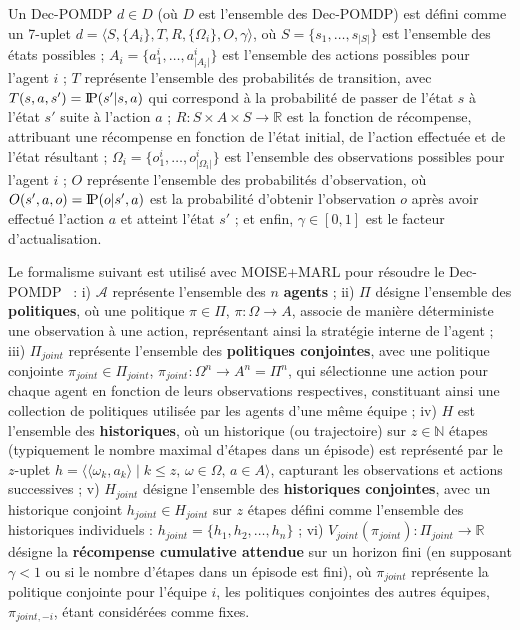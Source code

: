 \documentclass[francais,ROIA,Unicode,manuscript]{cedram}
\newcommand{\probP}{\text{I\kern-0.15em P}}
\begin{document}
Un Dec-POMDP $d \in D$ (où $D$ est l'ensemble des Dec-POMDP) est défini comme un 7-uplet
$d = \langle S, \{A_i\}, T, R, \{\Omega_i\}, O, \gamma \rangle$,
où
\(S = \{s_1,\dots,s_{|S|}\}\) est l'ensemble des états possibles ; \quad
\(A_i = \{a_{1}^{i},\dots,a_{|A_i|}^{i}\}\) est l'ensemble des actions possibles pour l'agent \(i\) ; \quad
\(T\) représente l'ensemble des probabilités de transition, avec \(T(s,a,s') = \probP(s'|s,a)\) qui correspond à la probabilité de passer de l'état \(s\) à l'état \(s'\) suite à l'action \(a\) ; \quad
\(R : S \times A \times S \rightarrow \mathbb{R}\) est la fonction de récompense, attribuant une récompense en fonction de l'état initial, de l'action effectuée et de l'état résultant ; \quad
\(\Omega_i = \{o_{1}^{i},\dots,o_{|\Omega_i|}^{i}\}\) est l'ensemble des observations possibles pour l'agent \(i\) ; \quad
\(O\) représente l'ensemble des probabilités d'observation, où \(O(s',a,o) = \probP(o|s',a)\) est la probabilité d'obtenir l'observation \(o\) après avoir effectué l'action \(a\) et atteint l'état \(s'\) ; \quad et enfin, \(\gamma \in [0,1]\) est le facteur d'actualisation.

Le formalisme suivant est utilisé avec MOISE+MARL pour résoudre le Dec-POMDP~\cite{Beynier2013,Albrecht2024} :
%
i) \(\mathcal{A}\) représente l'ensemble des \(n\) \textbf{agents}
; \quad
ii) \(\Pi\) désigne l'ensemble des \textbf{politiques}, où une politique \(\pi \in \Pi\), \(\pi: \Omega \rightarrow A\), associe de manière déterministe une observation à une action, représentant ainsi la stratégie interne de l'agent
; \quad
iii) \(\Pi_{joint}\) représente l'ensemble des \textbf{politiques conjointes}, avec une politique conjointe \(\pi_{joint} \in \Pi_{joint}\), \(\pi_{joint}: \Omega^n \rightarrow A^n = \Pi^n\), qui sélectionne une action pour chaque agent en fonction de leurs observations respectives, constituant ainsi une collection de politiques utilisée par les agents d'une même équipe
; \quad
iv) \(H\) est l'ensemble des \textbf{historiques}, où un historique (ou trajectoire) sur \(z \in \mathbb{N}\) étapes (typiquement le nombre maximal d'étapes dans un épisode) est représenté par le \(z\)-uplet $h = \langle \langle \omega_{k}, a_{k}\rangle \mid k \leq z,\, \omega \in \Omega,\, a \in A\rangle$, capturant les observations et actions successives
; \quad
v) \(H_{joint}\) désigne l'ensemble des \textbf{historiques conjointes}, avec un historique conjoint \(h_{joint} \in H_{joint}\) sur \(z\) étapes défini comme l'ensemble des historiques individuels : $h_{joint} = \{h_1, h_2, \dots, h_n\}$
; \quad
vi) \(V_{joint}(\pi_{joint}) : \Pi_{joint} \rightarrow \mathbb{R}\) désigne la \textbf{récompense cumulative attendue} sur un horizon fini (en supposant \(\gamma < 1\) ou si le nombre d'étapes dans un épisode est fini), où \(\pi_{joint}\) représente la politique conjointe pour l'équipe \(i\), les politiques conjointes des autres équipes, \(\pi_{joint,-i}\), étant considérées comme fixes.
\end{document}
